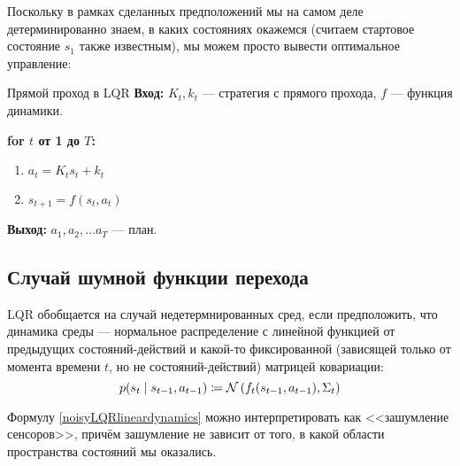 Поскольку в рамках сделанных предположений мы на самом деле детерминированно знаем, в каких состояниях окажемся (считаем стартовое состояние $s_1$ также известным), мы можем просто вывести оптимальное управление:
\begin{algorithm}{Прямой проход в LQR}
\textbf{Вход:} $K_t, k_t$ --- стратегия с прямого прохода, $f$ --- функция динамики.

\vspace{0.3cm}
\textbf{for $t$ от 1 до $T$:}
\begin{enumerate}
    \item $a_t = K_t s_t + k_t$
    \item $s_{t+1} = f(s_t, a_t)$
\end{enumerate}

\vspace{0.3cm}
\textbf{Выход:} $a_1, a_2, \dots a_T$ --- план.
\end{algorithm}

\subsection{Случай шумной функции перехода}

LQR обобщается на случай недетермнированных сред, если предположить, что динамика среды --- нормальное распределение с линейной функцией от предыдущих состояний-действий и какой-то фиксированной (зависящей только от момента времени $t$, но не состояний-действий) матрицей ковариации:
\begin{equation}\label{noisyLQRlineardynamics}
p(s_{t} \mid s_{t-1}, a_{t-1}) \coloneqq \mathcal{N} \left( f_t(s_{t-1}, a_{t-1}), \Sigma_t \right) 
\end{equation}

Формулу \eqref{noisyLQRlineardynamics} можно интерпретировать как <<зашумление сенсоров>>, причём зашумление не зависит от того, в какой области пространства состояний мы оказались.


